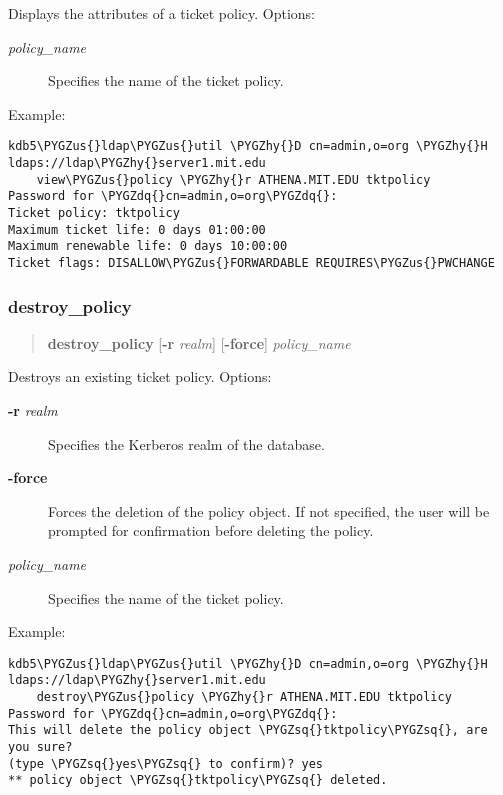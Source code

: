 \documentclass[letterpaper,10pt,english]{sphinxmanual}
\def\PYGZus{\char`\_}
\def\PYGZhy{\char`\-}
\def\PYGZsq{\char`\'}
\def\PYGZdq{\char`\"}
\begin{document}
Displays the attributes of a ticket policy.  Options:
\begin{description}
\item[{\emph{policy\_name}}] \leavevmode
Specifies the name of the ticket policy.

\end{description}

Example:

\begin{Verbatim}[commandchars=\\\{\}]
kdb5\PYGZus{}ldap\PYGZus{}util \PYGZhy{}D cn=admin,o=org \PYGZhy{}H ldaps://ldap\PYGZhy{}server1.mit.edu
    view\PYGZus{}policy \PYGZhy{}r ATHENA.MIT.EDU tktpolicy
Password for \PYGZdq{}cn=admin,o=org\PYGZdq{}:
Ticket policy: tktpolicy
Maximum ticket life: 0 days 01:00:00
Maximum renewable life: 0 days 10:00:00
Ticket flags: DISALLOW\PYGZus{}FORWARDABLE REQUIRES\PYGZus{}PWCHANGE
\end{Verbatim}


\subsubsection{destroy\_policy}
\label{admin/admin_commands/kdb5_ldap_util:destroy-policy}\label{admin/admin_commands/kdb5_ldap_util:kdb5-ldap-util-view-policy-end}\label{admin/admin_commands/kdb5_ldap_util:kdb5-ldap-util-destroy-policy}\begin{quote}

\textbf{destroy\_policy}
{[}\textbf{-r} \emph{realm}{]}
{[}\textbf{-force}{]}
\emph{policy\_name}
\end{quote}

Destroys an existing ticket policy.  Options:
\begin{description}
\item[{\textbf{-r} \emph{realm}}] \leavevmode
Specifies the Kerberos realm of the database.

\item[{\textbf{-force}}] \leavevmode
Forces the deletion of the policy object.  If not specified, the
user will be prompted for confirmation before deleting the policy.

\item[{\emph{policy\_name}}] \leavevmode
Specifies the name of the ticket policy.

\end{description}

Example:

\begin{Verbatim}[commandchars=\\\{\}]
kdb5\PYGZus{}ldap\PYGZus{}util \PYGZhy{}D cn=admin,o=org \PYGZhy{}H ldaps://ldap\PYGZhy{}server1.mit.edu
    destroy\PYGZus{}policy \PYGZhy{}r ATHENA.MIT.EDU tktpolicy
Password for \PYGZdq{}cn=admin,o=org\PYGZdq{}:
This will delete the policy object \PYGZsq{}tktpolicy\PYGZsq{}, are you sure?
(type \PYGZsq{}yes\PYGZsq{} to confirm)? yes
** policy object \PYGZsq{}tktpolicy\PYGZsq{} deleted.
\end{Verbatim}
\end{document}
